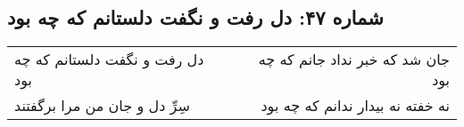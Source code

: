 \begin{center}
\section*{شماره ۴۷: دل رفت و نگفت دلستانم که چه بود}
\label{sec:047}
\begin{longtable}{l p{0.5cm} r}
دل رفت و نگفت دلستانم که چه بود
&&
جان شد که خبر نداد جانم که چه بود
\\
سِرِّ دل و جان من مرا برگفتند
&&
نه خفته نه بیدار ندانم که چه بود
\\
\end{longtable}
\end{center}
